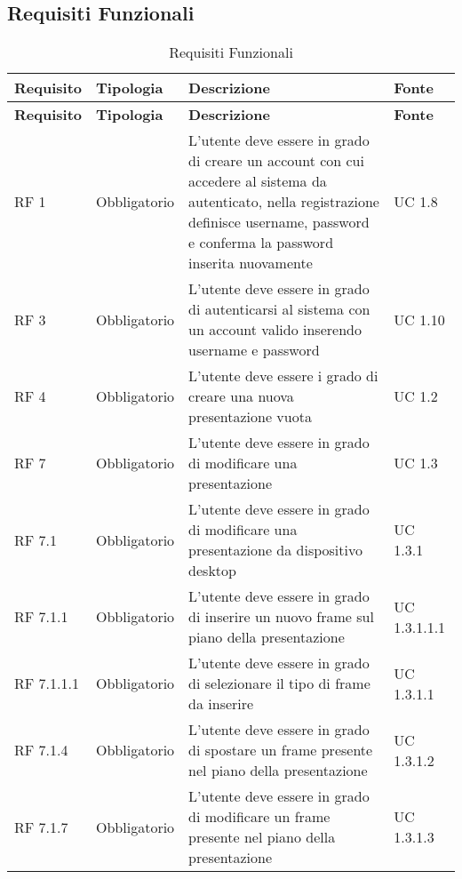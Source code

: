 \subsection{Requisiti Funzionali}{
		\renewcommand*{\arraystretch}{1.4}
		\begin{longtable} [c]{| p{2.5cm} | p{2.5cm} | p{6cm} |p{2.5cm}|}
			\caption{Requisiti Funzionali \label{tab:reqFunzionali}}\\
			 \hline
			 \textbf{Requisito} & \textbf{Tipologia} & \textbf{Descrizione} & \textbf{Fonte} \\
			 \hline
			 \endfirsthead
			 \hline
			 \textbf{Requisito} & \textbf{Tipologia} & \textbf{Descrizione} & \textbf{Fonte} \\
			 \hline
				\endhead
			 \hline
			 \endfoot
			 \hline
			 \endlastfoot
			RF 1 & Obbligatorio & L'utente deve essere in grado di creare un account\ped{g} con cui accedere al sistema da autenticato, nella registrazione definisce username, password e conferma la password inserita nuovamente & UC 1.8\\
			\hline
			RF 3 & Obbligatorio & L'utente deve essere in grado di autenticarsi al sistema con un account\ped{g} valido inserendo username e password & UC 1.10\\
			\hline
			RF 4 & Obbligatorio & L’utente deve essere i grado di creare una nuova presentazione vuota & UC 1.2\\
			\hline	
			RF 7 & Obbligatorio & L'utente deve essere in grado di modificare una presentazione & UC 1.3\\
			\hline
			RF 7.1 & Obbligatorio & L'utente deve essere in grado di modificare una presentazione da dispositivo desktop\ped{g} & UC 1.3.1\\						
			\hline
			RF 7.1.1 & Obbligatorio & L'utente deve essere in grado di inserire un nuovo frame\ped{g} sul piano della presentazione\ped{g} & UC 1.3.1.1.1\\
			\hline
			RF 7.1.1.1 & Obbligatorio & L'utente deve essere in grado di selezionare il tipo di frame\ped{g} da inserire & UC 1.3.1.1\\
			\hline
			RF 7.1.4 & Obbligatorio & L'utente deve essere in grado di spostare un frame\ped{g} presente nel piano della presentazione\ped{g} & UC 1.3.1.2\\
			\hline
			RF 7.1.7 & Obbligatorio & L'utente deve essere in grado di modificare un frame\ped{g} presente nel piano della presentazione\ped{g} & UC 1.3.1.3\\
			\hline

\end{longtable}}
